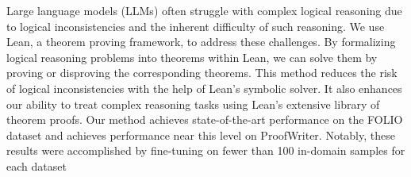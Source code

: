 Large language models (LLMs) often struggle with complex logical reasoning due to logical inconsistencies and the inherent difficulty of such reasoning. We use Lean, a theorem proving framework, to address these challenges. By formalizing logical reasoning problems into theorems within Lean, we can solve them by proving or disproving the corresponding theorems. This method reduces the risk of logical inconsistencies with the help of Lean’s symbolic solver. It also enhances our ability to treat complex reasoning tasks using Lean’s extensive library of theorem proofs. Our method achieves state-of-the-art performance on the FOLIO dataset and achieves performance near this level on ProofWriter. Notably, these results were accomplished by fine-tuning on fewer than 100 in-domain samples for each dataset